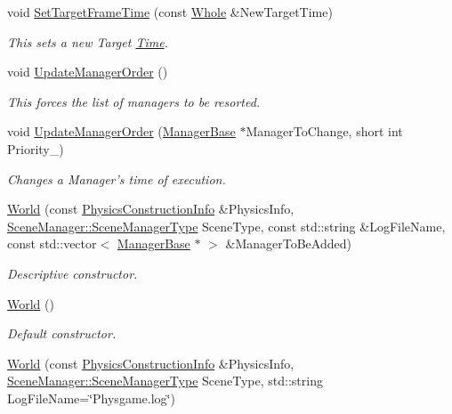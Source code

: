 \begin{DoxyCompactItemize}
void \hyperlink{classphys_1_1World_ad95b5a5ad73e0a05826b5bd834876333}{SetTargetFrameTime} (const \hyperlink{namespacephys_a460f6bc24c8dd347b05e0366ae34f34a}{Whole} \&NewTargetTime)
\begin{DoxyCompactList}\small\item\em This sets a new Target \hyperlink{structphys_1_1Time}{Time}. \item\end{DoxyCompactList}\item 
void \hyperlink{classphys_1_1World_ae807112b9494a94a6ff0d60df0a4d424}{UpdateManagerOrder} ()
\begin{DoxyCompactList}\small\item\em This forces the list of managers to be resorted. \item\end{DoxyCompactList}\item 
void \hyperlink{classphys_1_1World_abbe8ceecc6bdbd542a250fd721c05276}{UpdateManagerOrder} (\hyperlink{classphys_1_1ManagerBase}{ManagerBase} $\ast$ManagerToChange, short int Priority\_\-)
\begin{DoxyCompactList}\small\item\em Changes a Manager's time of execution. \item\end{DoxyCompactList}\item 
\hyperlink{classphys_1_1World_aae14ef90dc110e24d26f1df1b767fc56}{World} (const \hyperlink{classphys_1_1PhysicsConstructionInfo}{PhysicsConstructionInfo} \&PhysicsInfo, \hyperlink{classphys_1_1SceneManager_a14fe15dcf41564fdf12f3e11c1a4b774}{SceneManager::SceneManagerType} SceneType, const std::string \&LogFileName, const std::vector$<$ \hyperlink{classphys_1_1ManagerBase}{ManagerBase} $\ast$ $>$ \&ManagerToBeAdded)
\begin{DoxyCompactList}\small\item\em Descriptive constructor. \item\end{DoxyCompactList}\item 
\hyperlink{classphys_1_1World_a7f762724406c874250c3dc8910a1e695}{World} ()
\begin{DoxyCompactList}\small\item\em Default constructor. \item\end{DoxyCompactList}\item 
\hyperlink{classphys_1_1World_ab1b7cc9871373b4f14e40e28c32ead53}{World} (const \hyperlink{classphys_1_1PhysicsConstructionInfo}{PhysicsConstructionInfo} \&PhysicsInfo, \hyperlink{classphys_1_1SceneManager_a14fe15dcf41564fdf12f3e11c1a4b774}{SceneManager::SceneManagerType} SceneType, std::string LogFileName=\char`\"{}Physgame.log\char`\"{})

\end{DoxyCompactItemize}
